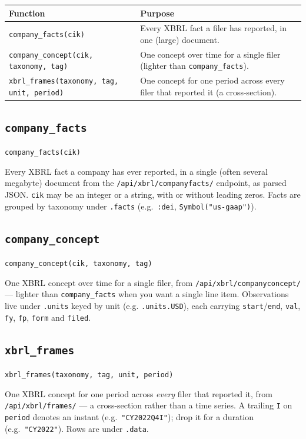\documentclass[11pt,a4paper]{report}
\newcommand{\sig}[1]{\medskip\noindent\texttt{#1}\par\medskip}
\begin{document}
\begin{longtable}{@{}p{}p{}@{}}
\toprule
\textbf{Function} & \textbf{Purpose} \\
\midrule
\endhead
\texttt{company\_facts(cik)} & Every XBRL fact a filer has reported, in one
  (large) document. \\
\texttt{company\_concept(cik, taxonomy, tag)} & One concept over time for a single
  filer (lighter than \texttt{company\_facts}). \\
\texttt{xbrl\_frames(taxonomy, tag, unit, period)} & One concept for one period
  across every filer that reported it (a cross-section). \\
\bottomrule
\end{longtable}

\subsection{\texttt{company\_facts}}

\sig{company\_facts(cik)}

\noindent Every XBRL fact a company has ever reported, in a single (often several
megabyte) document from the \texttt{/api/xbrl/companyfacts/} endpoint, as parsed
JSON. \texttt{cik} may be an integer or a string, with or without leading zeros.
Facts are grouped by taxonomy under \texttt{.facts} (e.g.\ \texttt{:dei},
\texttt{Symbol("us-gaap")}).

\subsection{\texttt{company\_concept}}

\sig{company\_concept(cik, taxonomy, tag)}

\noindent One XBRL concept over time for a single filer, from
\texttt{/api/xbrl/companyconcept/} --- lighter than \texttt{company\_facts} when you
want a single line item. Observations live under \texttt{.units} keyed by unit (e.g.
\texttt{.units.USD}), each carrying \texttt{start}/\texttt{end}, \texttt{val}, \texttt{fy},
\texttt{fp}, \texttt{form} and \texttt{filed}.

\subsection{\texttt{xbrl\_frames}}

\sig{xbrl\_frames(taxonomy, tag, unit, period)}

\noindent One XBRL concept for one period across \emph{every} filer that reported
it, from \texttt{/api/xbrl/frames/} --- a cross-section rather than a time series. A
trailing \texttt{I} on \texttt{period} denotes an instant (e.g.\ \texttt{"CY2022Q4I"});
drop it for a duration (e.g.\ \texttt{"CY2022"}). Rows are under \texttt{.data}.
\end{document}
